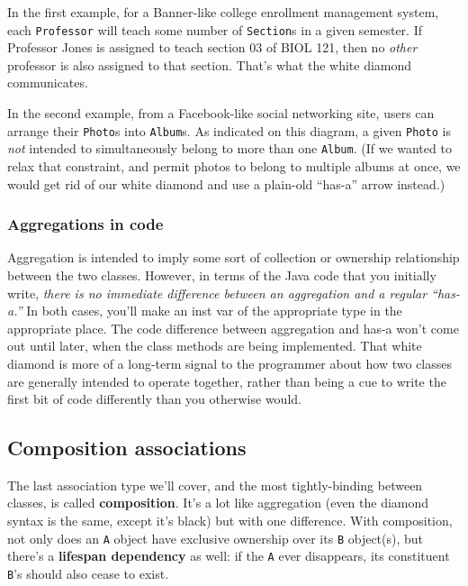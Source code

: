 In the first example, for a Banner-like college enrollment management system,
each \texttt{Professor} will teach some number of \texttt{Section}s in a given
semester. If Professor Jones is assigned to teach section 03 of BIOL 121, then
no \textit{other} professor is also assigned to that section. That's what the
white diamond communicates.

In the second example, from a Facebook-like social networking site, users can
arrange their \texttt{Photo}s into \texttt{Album}s. As indicated on this
diagram, a given \texttt{Photo} is \textit{not} intended to simultaneously
belong to more than one \texttt{Album}. (If we wanted to relax that
constraint, and permit photos to belong to multiple albums at once, we would
get rid of our white diamond and use a plain-old ``has-a'' arrow instead.)

\subsubsection{Aggregations in code}

Aggregation is intended to imply some sort of collection or ownership
relationship between the two classes. However, in terms of the Java code that
you initially write, \textit{there is no immediate difference between an
aggregation and a regular ``has-a.''} In both cases, you'll make an inst var of
the appropriate type in the appropriate place. The code difference between
aggregation and has-a won't come out until later, when the class methods are
being implemented. That white diamond is more of a long-term signal to the
programmer about how two classes are generally intended to operate together,
rather than being a cue to write the first bit of code differently than you
otherwise would.

\subsection{Composition associations}

The last association type we'll cover, and the most tightly-binding between
classes, is called \textbf{composition}. It's a lot like aggregation (even the
diamond syntax is the same, except it's black) but with one difference. With
composition, not only does an \texttt{A} object have exclusive ownership over
its \texttt{B} object(s), but there's a \textbf{lifespan dependency} as well:
if the \texttt{A} ever disappears, its constituent \texttt{B}'s should also
cease to exist.

